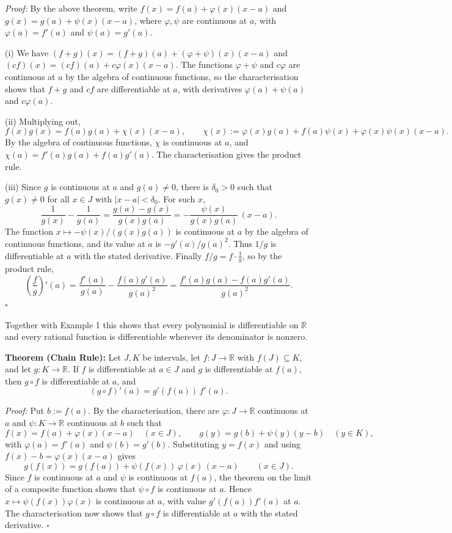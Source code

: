 \documentclass[a4paper,11pt,abstracton]{scrartcl}
\newcommand{\RR}{\mathbb{R}}
\theoremstyle{dotlessP}
\theoremstyle{dotlessS}
\theoremstyle{remark}
\theoremstyle{definition}
\begin{document}
\begin{claim_box}
\textit{Proof:}
By the above theorem, write $f(x)=f(a)+\varphi(x)(x-a)$ and $g(x)=g(a)+\psi(x)(x-a)$, where $\varphi,\psi$ are continuous at $a$, with $\varphi(a)=f'(a)$ and $\psi(a)=g'(a)$.

(i) We have $(f+g)(x)=(f+g)(a)+(\varphi+\psi)(x)(x-a)$ and $(cf)(x)=(cf)(a)+c\varphi(x)(x-a)$. The functions $\varphi+\psi$ and $c\varphi$ are continuous at $a$ by the algebra of continuous functions, so the characterisation shows that $f+g$ and $cf$ are differentiable at $a$, with derivatives $\varphi(a)+\psi(a)$ and $c\varphi(a)$.

(ii) Multiplying out,
\[
    f(x)g(x)=f(a)g(a)+\chi(x)(x-a),\qquad
    \chi(x):=\varphi(x)g(a)+f(a)\psi(x)+\varphi(x)\psi(x)(x-a).
\]
By the algebra of continuous functions, $\chi$ is continuous at $a$, and $\chi(a)=f'(a)g(a)+f(a)g'(a)$. The characterisation gives the product rule.

(iii) Since $g$ is continuous at $a$ and $g(a)\ne0$, there is $\delta_0>0$ such that $g(x)\ne0$ for all $x\in J$ with $|x-a|<\delta_0$. For such $x$,
\[
    \frac1{g(x)}-\frac1{g(a)}=\frac{g(a)-g(x)}{g(x)g(a)}
    =-\frac{\psi(x)}{g(x)g(a)}\,(x-a).
\]
The function $x\mapsto-\psi(x)/(g(x)g(a))$ is continuous at $a$ by the algebra of continuous functions, and its value at $a$ is $-g'(a)/g(a)^2$. Thus $1/g$ is differentiable at $a$ with the stated derivative. Finally $f/g=f\cdot\frac1g$, so by the product rule,
\[
    \left(\frac fg\right)'(a)=\frac{f'(a)}{g(a)}-\frac{f(a)g'(a)}{g(a)^2}
    =\frac{f'(a)g(a)-f(a)g'(a)}{g(a)^2}.
\]
\hfill$\square$
\end{claim_box}

Together with Example 1 this shows that every polynomial is differentiable on $\RR$ and every rational function is differentiable wherever its denominator is nonzero.

\begin{problem_box}
\textbf{Theorem (Chain Rule):}
Let $J,K$ be intervals, let $f:J\to\RR$ with $f(J)\subseteq K$, and let $g:K\to\RR$. If $f$ is differentiable at $a\in J$ and $g$ is differentiable at $f(a)$, then $g\circ f$ is differentiable at $a$, and
\[
    \boxed{(g\circ f)'(a)=g'(f(a))\,f'(a).}
\]
\end{problem_box}

\begin{claim_box}
\textit{Proof:}
Put $b:=f(a)$. By the characterisation, there are $\varphi:J\to\RR$ continuous at $a$ and $\psi:K\to\RR$ continuous at $b$ such that
\[
    f(x)=f(a)+\varphi(x)(x-a)\quad(x\in J),\qquad
    g(y)=g(b)+\psi(y)(y-b)\quad(y\in K),
\]
with $\varphi(a)=f'(a)$ and $\psi(b)=g'(b)$. Substituting $y=f(x)$ and using $f(x)-b=\varphi(x)(x-a)$ gives
\[
    g(f(x))=g(f(a))+\psi(f(x))\,\varphi(x)\,(x-a)\qquad(x\in J).
\]
Since $f$ is continuous at $a$ and $\psi$ is continuous at $f(a)$, the theorem on the limit of a composite function shows that $\psi\circ f$ is continuous at $a$. Hence $x\mapsto\psi(f(x))\varphi(x)$ is continuous at $a$, with value $g'(f(a))f'(a)$ at $a$. The characterisation now shows that $g\circ f$ is differentiable at $a$ with the stated derivative.
\hfill$\square$
\end{claim_box}
\end{document}
